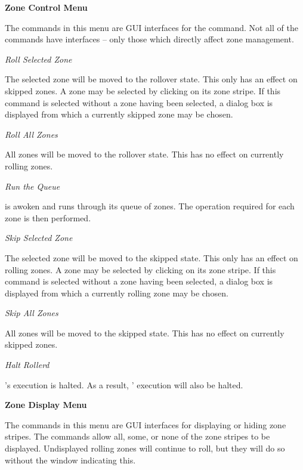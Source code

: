 {\bf Zone Control Menu}

The commands in this menu are GUI interfaces for the  command.
Not all of the  commands have interfaces -- only those which
directly affect zone management.

\begin{description}

\item {\it Roll Selected Zone}

The selected zone will be moved to the rollover state.  This only has an
effect on skipped zones.  A zone may be selected by clicking on its zone
stripe.  If this command is selected without a zone having been selected,
a dialog box is displayed from which a currently skipped zone may be chosen.

\item {\it Roll All Zones}

All zones will be moved to the rollover state.  This has no effect on
currently rolling zones.

\item {\it Run the Queue}

 is awoken and runs through its queue of zones.  The operation
required for each zone is then performed.

\item {\it Skip Selected Zone}

The selected zone will be moved to the skipped state.  This only has an effect
on rolling zones.  A zone may be selected by clicking on its zone stripe.  If
this command is selected without a zone having been selected, a dialog box is
displayed from which a currently rolling zone may be chosen.

\item {\it Skip All Zones}

All zones will be moved to the skipped state.  This has no effect on
currently skipped zones.

\item {\it Halt Rollerd}

's execution is halted.  As a result, '
execution will also be halted.

\end{description}

{\bf Zone Display Menu}

The commands in this menu are GUI interfaces for displaying or hiding zone
stripes.  The commands allow all, some, or none of the zone stripes to be
displayed.  Undisplayed rolling zones will continue to roll, but they will
do so without the  window indicating this.

